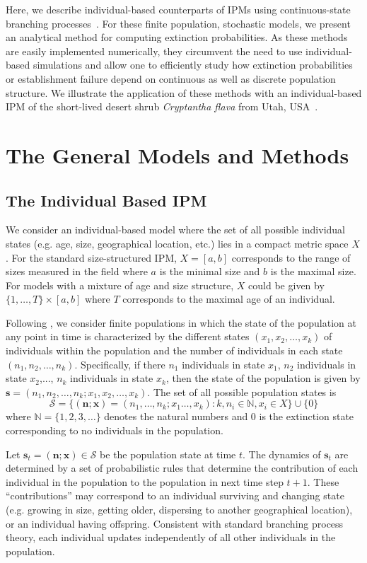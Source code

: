 \documentclass[12pt]{amsart}\usepackage[]{graphicx}\usepackage[]{color}
\def\N{\mathbb N}
\def\N{\mathbb N}
\def\S{\mathcal S}
\def\n{\mathbf n}
\def\x{\mathbf x}
\def\s{\mathbf s}
\begin{document}
Here, we describe individual-based counterparts of IPMs using continuous-state branching processes~\citep{harris-63}. For these finite population, stochastic models, we present an analytical method for computing extinction probabilities. As these methods are easily implemented numerically, they circumvent the need to use individual-based simulations and allow one to efficiently study how extinction probabilities or establishment failure depend on continuous as well as discrete population structure. We illustrate the application of these methods with an individual-based IPM of the short-lived desert shrub \emph{Cryptantha flava} from Utah, USA~\citet{salguero-etal-12}.


\section*{The General Models and Methods}


\subsection*{The Individual Based IPM}
We consider an individual-based model where the set of all possible individual states (e.g. age, size, geographical location, etc.) lies in a compact metric space $X$. For the standard size-structured IPM, $X=[a,b]$ corresponds to the range of sizes measured in the field where $a$ is the minimal size and $b$ is the maximal size. For models with a mixture of age and size structure, $X$ could be given by $\{1,\dots,T\}\times [a,b]$ where $T$ corresponds to the maximal age of an individual.

Following \citet{harris-63},  we consider finite populations in which the state of the population at any point in time is characterized by the different states $(x_1,x_2,\dots, x_k)$  of individuals within the population and the number of individuals in each state $(n_1,n_2,\dots, n_k)$. Specifically, if there $n_1$ individuals in state $x_1$, $n_2$ individuals in state $x_2$,..., $n_k$ individuals in state $x_k$, then the state of the population is given by $\s=(n_1,n_2,\dots, n_k; x_1,x_2,\dots, x_k)$. The set of all possible population states is
\[
\S= \{(\n;\x)=(n_1,\dots, n_k; x_1\dots , x_k): k,n_i\in \N, x_i \in X\} \cup \{0\}
\]
where $\N=\{1,2,3,\dots\}$ denotes the natural numbers and $0$ is the extinction state corresponding to no individuals in the population.

Let  $\s_t=( \n; \x)\in \S$ be the population state at time $t$. The dynamics of $\s_t$ are determined by a set of probabilistic rules that determine the contribution of each individual in the population to the population in next time step $t+1$. These ``contributions'' may correspond to an individual surviving and changing state (e.g. growing in size, getting older, dispersing to another geographical location), or an individual having offspring.  Consistent with standard branching process theory, each individual updates independently of all other individuals  in the population.
\end{document}
